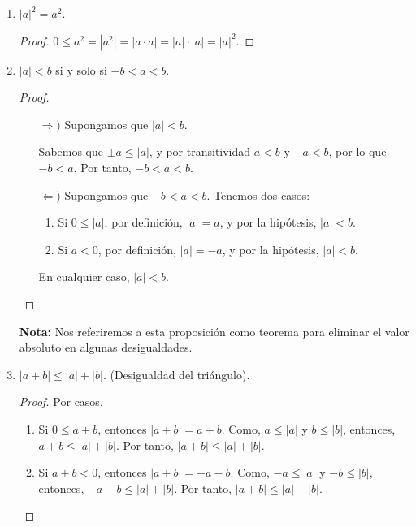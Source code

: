 \documentclass[11pt]{article}
\begin{document}
\begin{enumerate}[label=\alph*)]
\item $|a|^2=a^2$.
\vspace{-1em}\begin{proof} 
    $0 \leq a^2 = |a^2|= |a\cdot a|=|a| \cdot |a|= |a|^2$. \qedhere
\end{proof} \vspace{-1em}

\item $|a|<b$ si y solo si $-b<a<b$.

\vspace{-1em}\begin{proof} \leavevmode
    \begin{itemize}
        \item[$\Rightarrow)$] Supongamos que $|a|<b$.
        
        Sabemos que $\pm a \leq |a|$, y por transitividad $a<b$ y $-a<b$, por lo que $-b<a$. Por tanto, $-b<a<b$.
        \item[$\Leftarrow)$] Supongamos que $-b<a<b$. Tenemos dos casos: \begin{enumerate}[label=\roman*)]
            \item Si $0\leq |a|$, por definición, $|a|=a$, y por la hipótesis, $|a|<b$.
            \item Si $a<0$, por definición, $|a|=-a$, y por la hipótesis, $|a|<b$.
        \end{enumerate} En cualquier caso, $|a|<b$. \qedhere 
    \end{itemize}
\end{proof} \vspace{-1em}

\textbf{Nota:} Nos referiremos a esta proposición como teorema para eliminar el valor absoluto en algunas desigualdades.

\pagebreak

\item $|a+b|\leq |a|+|b|$. (Desigualdad del triángulo).

\vspace{-1em}\begin{proof} 
    Por casos.
    \begin{enumerate}[label=\roman*)]
        \item Si $0 \leq a+b$, entonces $|a+b|=a+b$. Como, $a \leq |a|$ y $b \leq |b|$, entonces, $a+b \leq |a|+|b|$. Por tanto, $|a+b| \leq |a|+|b|$.
        \item Si $a+b<0$, entonces $|a+b|=-a-b$. Como, $-a \leq |a|$ y $-b \leq |b|$, entonces, $-a-b \leq |a|+|b|$. Por tanto, $|a+b| \leq |a|+|b|$. \qedhere
    \end{enumerate}    
\end{proof} \vspace{-1em}


\end{enumerate}
\end{document}
